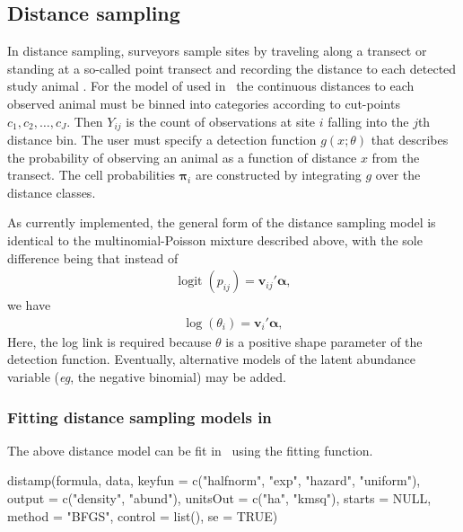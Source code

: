 \documentclass[article,shortnames]{jss}
\DeclareMathOperator{\logit}{logit}
\newcommand{\um}{\pkg{unmarked}}
\begin{document}
\subsection{Distance sampling}

In distance sampling, surveyors sample sites by traveling along a
transect or standing at a so-called point transect and recording the
distance to each detected study animal
\citep{Thomas2010}.  For the model of \citep{Royle2004b} used in \um\,
the continuous distances to each observed animal must be binned into 
categories according to cut-points $c_1, c_2,\dots,c_{J}$.  
Then  $Y_{ij}$ is the count of observations at site $i$ falling into
the $j$th distance bin.  The user must specify a
detection function $g(x;\theta)$ that describes the probability of
observing an animal as a function of distance $x$ from the transect. 
The cell probabilities $\mathbf \pi_i$ are
constructed by integrating $g$ over the distance classes.

As currently implemented, the general form of the distance sampling model
is identical to the multinomial-Poisson mixture described above, with the
sole difference being that instead of
\begin{gather}
  \logit(p_{ij}) = \mathbf v_{ij}' \mathbf \alpha,
\end{gather}
we have 
\begin{gather}
  \log(\theta_i) = \mathbf v_{i}' \mathbf \alpha,
\end{gather}
Here, the log link is required because $\theta$ is a positive shape parameter 
of the detection function. Eventually, alternative models of the latent 
abundance variable (\emph{eg}, the negative binomial) may be added.


\subsubsection[Fitting distance sampling models in unmarked]{Fitting distance sampling models in }

The above distance model can be fit in \um\ using the 
fitting function.

\begin{Code}
distamp(formula, data, keyfun = c("halfnorm", "exp", "hazard", 
    "uniform"), output = c("density", "abund"), unitsOut = c("ha", 
    "kmsq"), starts = NULL, method = "BFGS", control = list(), 
    se = TRUE)
\end{Code}
\end{document}
